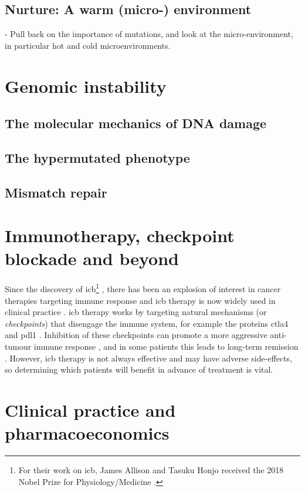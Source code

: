 \documentclass[../thesis.tex]{subfiles}
\begin{document}
\subsection{Nurture: A warm (micro-) environment}
- Pull back on the importance of mutations, and look at the micro-environment, in particular hot and cold microenvironments. \citep{keenan_genomic_2019} \citep{boulter_fibrotic_2020}



\section{Genomic instability}
\subsection{The molecular mechanics of DNA damage}
\subsection{The hypermutated phenotype}
\subsection{Mismatch repair}
\section{Immunotherapy, checkpoint blockade and beyond}
Since the discovery of \gls{icb}\footnote{For their work on \gls{icb}, James Allison and Tasuku Honjo received the 2018 Nobel Prize for Physiology/Medicine \citep{ledford_cancer_2018}.}  \citep{ishida_induced_1992,leach_enhancement_1996},  there has been an explosion of interest in cancer therapies targeting immune response and \gls{icb} therapy is now widely used in clinical practice \citep{robert_decade_2020}.  \gls{icb} therapy works by targeting natural mechanisms (or \emph{checkpoints}) that disengage the immune system, for example the proteins \gls{ctla4} and \gls{pdl1} \citep{buchbinder_ctla-4_2016}. Inhibition of these checkpoints can promote a more aggressive anti-tumour immune response \citep{pardoll_blockade_2012}, and in some patients this leads to long-term remission \citep{gettinger_5-year_2019}. However, \gls{icb} therapy is not always effective \citep{nowicki_mechanisms_2018} and may have adverse side-effects, so determining which patients will benefit in advance of treatment is vital. 

\section{Clinical practice and pharmacoeconomics}
\end{document}

